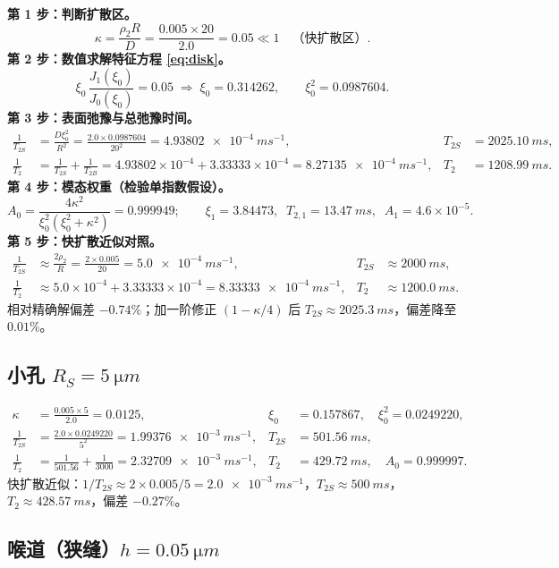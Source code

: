 \documentclass[11pt,a4paper]{article}
\newcommand{\TB}{T_{2B}}
\newcommand{\Ts}{T_{2S}}
\begin{document}
\textbf{第 1 步：判断扩散区。}
\[
\kappa=\frac{\rho_2R}{D}=\frac{0.005\times 20}{2.0}=0.05\ll 1\quad\text{（快扩散区）}.
\]
\textbf{第 2 步：数值求解特征方程 \eqref{eq:disk}。}
\[
\xi_0\,\frac{J_1(\xi_0)}{J_0(\xi_0)}=0.05
\;\Longrightarrow\;
\xi_0=0.314262,\qquad \xi_0^{2}=0.0987604 .
\]
\textbf{第 3 步：表面弛豫与总弛豫时间。}
\begin{align*}
\frac{1}{\Ts}&=\frac{D\xi_0^{2}}{R^{2}}=\frac{2.0\times0.0987604}{20^{2}}=\SI{4.93802e-4}{ms^{-1}},
&\Ts&=\SI{2025.10}{ms},\\
\frac{1}{T_2}&=\frac{1}{\Ts}+\frac{1}{\TB}=4.93802\times10^{-4}+3.33333\times10^{-4}=\SI{8.27135e-4}{ms^{-1}},
&T_2&=\SI{1208.99}{ms}.
\end{align*}
\textbf{第 4 步：模态权重（检验单指数假设）。}
\[
A_0=\frac{4\kappa^2}{\xi_0^2(\xi_0^2+\kappa^2)}=0.999949;\qquad
\xi_1=3.84473,\;\; T_{2,1}=\SI{13.47}{ms},\;\; A_1=4.6\times10^{-5}.
\]
\textbf{第 5 步：快扩散近似对照。}
\begin{align*}
\frac{1}{\Ts}&\approx\frac{2\rho_2}{R}=\frac{2\times0.005}{20}=\SI{5.0e-4}{ms^{-1}},
&\Ts&\approx\SI{2000}{ms},\\
\frac{1}{T_2}&\approx5.0\times10^{-4}+3.33333\times10^{-4}=\SI{8.33333e-4}{ms^{-1}},
&T_2&\approx\SI{1200.0}{ms}.
\end{align*}
相对精确解偏差 $-0.74\%$；加一阶修正 $(1-\kappa/4)$ 后 $\Ts\approx\SI{2025.3}{ms}$，偏差降至 $0.01\%$。

\subsection{小孔 $R_S=\SI{5}{\micro m}$}

\begin{align*}
\kappa&=\frac{0.005\times5}{2.0}=0.0125,
&\xi_0&=0.157867,\quad \xi_0^{2}=0.0249220,\\
\frac{1}{\Ts}&=\frac{2.0\times0.0249220}{5^{2}}=\SI{1.99376e-3}{ms^{-1}},
&\Ts&=\SI{501.56}{ms},\\
\frac{1}{T_2}&=\frac{1}{501.56}+\frac{1}{3000}=\SI{2.32709e-3}{ms^{-1}},
&T_2&=\SI{429.72}{ms},\quad A_0=0.999997 .
\end{align*}
快扩散近似：$1/\Ts\approx 2\times0.005/5=\SI{2.0e-3}{ms^{-1}}$，$\Ts\approx\SI{500}{ms}$，
$T_2\approx\SI{428.57}{ms}$，偏差 $-0.27\%$。

\subsection{喉道（狭缝）$h=\SI{0.05}{\micro m}$}
\end{document}
